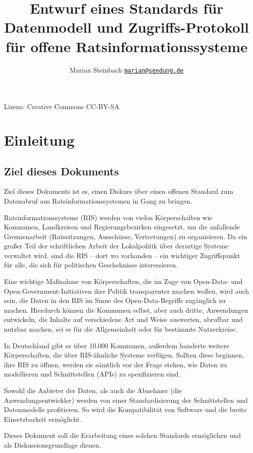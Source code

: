 \documentclass[,a4paper]{article}
\title{Entwurf eines Standards für Datenmodell und Zugriffs-Protokoll für
       offene Ratsinformationssysteme}
\author{Marian Steinbach
                \href{mailto:marian@sendung.de}{\texttt{marian@sendung.de}}}
\date{}
\begin{document}
\maketitle

Lizenz: Creative Commons CC-BY-SA

\section{Einleitung}

\subsection{Ziel dieses Dokuments}

Ziel dieses Dokuments ist es, einen Diskurs über einen offenen Standard
zum Datenabruf aus Ratsinformationssystemen in Gang zu bringen.

Ratsinformationssysteme (RIS) werden von vielen Körperschaften wie
Kommunen, Landkreisen und Regierungsbezirken eingesetzt, um die
anfallende Gremienarbeit (Ratssitzungen, Ausschüsse, Vertretungen) zu
organisieren. Da ein großer Teil der schriftlichen Arbeit der
Lokalpolitik über derartige Systeme verwaltet wird, sind die RIS -- dort
wo vorhanden -- ein wichtiger Zugriffspunkt für alle, die sich für
politischen Geschehnisse interessieren.

Eine wichtige Maßnahme von Körperschaften, die im Zuge von Open-Data-
und Open-Government-Initiativen ihre Politik transparenter machen
wollen, wird auch sein, die Daten in den RIS im Sinne des
Open-Data-Begriffs zugänglich zu machen. Hierdurch können die Kommunen
selbst, aber auch dritte, Anwendungen entwickeln, die Inhalte auf
verschiedene Art und Weise auswerten, abrufbar und nutzbar machen, sei
es für die Allgemeinheit oder für bestimmte Nutzerkreise.

In Deutschland gibt es über 10.000 Kommunen, außerdem hunderte weitere
Körperschaften, die über RIS-ähnliche Systeme verfügen. Sollten diese
beginnen, ihre RIS zu öffnen, werden sie sämtlich vor der Frage stehen,
wie Daten zu modellieren und Schnittstellen (APIs) zu spezifizieren
sind.

Sowohl die Anbieter der Daten, als auch die Abnehmer (die
Anwendungsentwickler) werden von einer Standardisierung der
Schnittstellen und Datenmodelle profitieren. So wird die Kompatibilität
von Software und die breite Einsetzbarkeit ermöglicht.

Dieses Dokument soll die Erarbeitung eines solchen Standards ermöglichen
und als Diskussionsgrundlage dienen.
\end{document}
